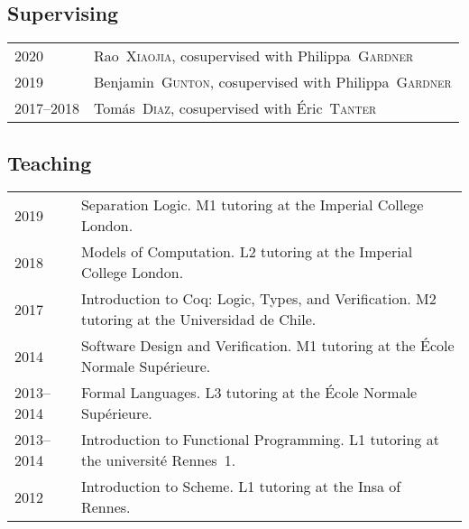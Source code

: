 \documentclass[12pt,a4paper]{article}
\makeatletter
\newcommand{\fr}[1]{\foreignlanguage{french}{{#1}}}
\newcommand{\es}[1]{\foreignlanguage{spanish}{{#1}}}
\newcommand{\fr}[1]{\foreignlanguage{francais}{{#1}}}
\newcommand{\es}[1]{\foreignlanguage{spanish}{{#1}}}
\newenvironment{datecvsection}[1]%
               {\subsection*{#1}%
                 \noindent \begin{tabular}{@{}p{\annee}p{\texte}@{}}}
               {\end{tabular}}
\newcommand\familyName{\textsc}
\newcommand\placeName{}
\makeatother
\begin{document}
\begin{datecvsection}{Supervising}

    2020 & Rao~\familyName{Xiaojia}, cosupervised with Philippa~\familyName{Gardner} \\
    2019 & Benjamin~\familyName{Gunton}, cosupervised with Philippa~\familyName{Gardner} \\
    2017–2018 & Tomás~\familyName{Diaz}, cosupervised with Éric~\familyName{Tanter} \\

\end{datecvsection}

\begin{datecvsection}{Teaching}

    2019 & Separation Logic. M1 tutoring at the Imperial College London. \\

    2018 & Models of Computation. L2 tutoring at the Imperial College London. \\

    2017 & Introduction to Coq: Logic, Types, and Verification. M2 tutoring at the \es{\placeName{Universidad de Chile}}. \\

    2014 & Software Design and Verification. M1 tutoring at the \fr{\placeName{École Normale Supérieure}}. \\

    2013–2014 & Formal Languages. L3 tutoring at the \fr{\placeName{École Normale Supérieure}}. \\

    2013–2014 & Introduction to Functional Programming. L1 tutoring at the \fr{université \placeName{Rennes}~1}. \\

    2012 & Introduction to Scheme. L1 tutoring at the \placeName{Insa} of \placeName{Rennes}. \\

\end{datecvsection}
\end{document}
